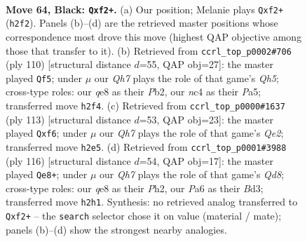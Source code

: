 \documentclass[11pt]{article}
\begin{document}
\clearpage

\begin{figure}[p]\centering
\begin{subfigure}{0.46\textwidth}\centering
\resizebox{\linewidth}{!}{%
\newchessgame
\chessboard[
  setfen={4Q3/8/p4k2/3P3p/2N3p1/4Q3/5P1q/5KN1 b - - 0 64},
  showmover=false,
  pgfstyle=straightmove, color=movearrow, markmove={h2-f2}
]}
\caption{}
\end{subfigure}\hfill
\begin{subfigure}{0.46\textwidth}\centering
\resizebox{\linewidth}{!}{%
\newchessgame
\chessboard[
  setfen={6k1/5p2/p6b/P6Q/2p1Pq2/7P/1P6/6BK w - - 1 56},
  showmover=false,
  pgfstyle=straightmove, color=movearrow, markmove={h5-f5}
]}
\caption{}
\end{subfigure}
\\[4pt]
\begin{subfigure}{0.46\textwidth}\centering
\resizebox{\linewidth}{!}{%
\newchessgame
\chessboard[
  setfen={8/4q1k1/5Np1/7p/3P4/4PQ2/6K1/8 b - - 0 57},
  showmover=false,
  pgfstyle=straightmove, color=movearrow, markmove={e7-f6}
]}
\caption{}
\end{subfigure}\hfill
\begin{subfigure}{0.46\textwidth}\centering
\resizebox{\linewidth}{!}{%
\newchessgame
\chessboard[
  setfen={3Q4/8/3bk3/1P2q1pp/8/3B1P2/7P/7K w - - 4 59},
  showmover=false,
  pgfstyle=straightmove, color=movearrow, markmove={d8-e8}
]}
\caption{}
\end{subfigure}
\caption{\textbf{Move 64, Black: \texttt{Qxf2+}.} (a) Our position; Melanie plays \texttt{Qxf2+} (\texttt{h2f2}). Panels (b)--(d) are the retrieved master positions whose correspondence most drove this move (highest QAP objective among those that transfer to it). (b) Retrieved from \texttt{ccrl\_top\_p0002\#706} (ply 110) [structural distance $d$=55, QAP obj=27]: the master played \texttt{Qf5}; under $\mu$ our \emph{Qh7} plays the role of that game's \emph{Qh5}; cross-type roles: our \emph{q}e8 as their \emph{P}b2, our \emph{n}c4 as their \emph{P}a5; transferred move \texttt{h2f4}. (c) Retrieved from \texttt{ccrl\_top\_p0000\#1637} (ply 113) [structural distance $d$=53, QAP obj=23]: the master played \texttt{Qxf6}; under $\mu$ our \emph{Qh7} plays the role of that game's \emph{Qe2}; transferred move \texttt{h2e5}. (d) Retrieved from \texttt{ccrl\_top\_p0001\#3988} (ply 116) [structural distance $d$=54, QAP obj=17]: the master played \texttt{Qe8+}; under $\mu$ our \emph{Qh7} plays the role of that game's \emph{Qd8}; cross-type roles: our \emph{q}e8 as their \emph{P}h2, our \emph{P}a6 as their \emph{B}d3; transferred move \texttt{h2h1}. Synthesis: no retrieved analog transferred to \texttt{Qxf2+} -- the \texttt{search} selector chose it on value (material / mate); panels (b)--(d) show the strongest nearby analogies.}
\label{fig:thought-m127}
\end{figure}
\end{document}

